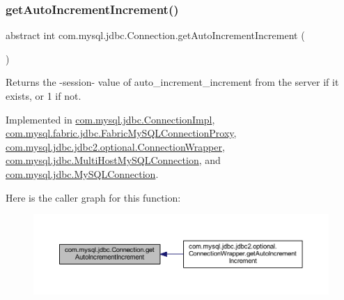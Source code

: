 \subsubsection{\texorpdfstring{get\+Auto\+Increment\+Increment()}{getAutoIncrementIncrement()}}
{\footnotesize\ttfamily abstract int com.\+mysql.\+jdbc.\+Connection.\+get\+Auto\+Increment\+Increment (\begin{DoxyParamCaption}{ }\end{DoxyParamCaption})\hspace{0.3cm}{\ttfamily [abstract]}}

Returns the -\/session-\/ value of \textquotesingle{}auto\+\_\+increment\+\_\+increment\textquotesingle{} from the server if it exists, or \textquotesingle{}1\textquotesingle{} if not. 

Implemented in \mbox{\hyperlink{classcom_1_1mysql_1_1jdbc_1_1_connection_impl_aa8687ff453437195ecc1ee3d3598e4a6}{com.\+mysql.\+jdbc.\+Connection\+Impl}}, \mbox{\hyperlink{classcom_1_1mysql_1_1fabric_1_1jdbc_1_1_fabric_my_s_q_l_connection_proxy_ac369523a903e1f8fb0c590a87cf2430c}{com.\+mysql.\+fabric.\+jdbc.\+Fabric\+My\+S\+Q\+L\+Connection\+Proxy}}, \mbox{\hyperlink{classcom_1_1mysql_1_1jdbc_1_1jdbc2_1_1optional_1_1_connection_wrapper_aabd8b0c60542e830e0fccfc8ed0ab005}{com.\+mysql.\+jdbc.\+jdbc2.\+optional.\+Connection\+Wrapper}}, \mbox{\hyperlink{classcom_1_1mysql_1_1jdbc_1_1_multi_host_my_s_q_l_connection_a4b95550806cfbdb36263ec1e37a5c971}{com.\+mysql.\+jdbc.\+Multi\+Host\+My\+S\+Q\+L\+Connection}}, and \mbox{\hyperlink{interfacecom_1_1mysql_1_1jdbc_1_1_my_s_q_l_connection_acb6ababcad41a91c6a44d300d09acff9}{com.\+mysql.\+jdbc.\+My\+S\+Q\+L\+Connection}}.

Here is the caller graph for this function\+:\nopagebreak
\begin{figure}[H]
\begin{center}
\leavevmode
\includegraphics[width=350pt]{interfacecom_1_1mysql_1_1jdbc_1_1_connection_ab681fd9ce4ce7b52529c0bea9134fc7c_icgraph}
\end{center}
\end{figure}
\mbox{\label{interfacecom_1_1mysql_1_1jdbc_1_1_connection_ae3e5825f1ce28db5688c14a0ddbd95f9}} 
